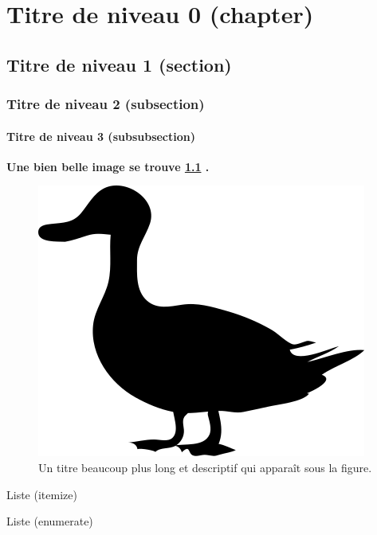 \chapter{Titre de niveau 0 (chapter)}
\thispagestyle{plainStarred}


\blindtext


\section{Titre de niveau 1 (section)}
\blindtext

	\subsection{Titre de niveau 2 (subsection)}
\blindtext

		\subsubsection{Titre de niveau 3 (subsubsection)}
\blindtext

\textbf{Une bien belle image se trouve \cref{fig56} .}

\begin{figure}
\begin{center}
	\includegraphics[scale=.8]{figures/conclu/figure_56.png}
	\caption[Titre court table des matières]{Un titre beaucoup plus long et descriptif qui apparaît sous la figure.}
	\label{fig56}
\end{center}
\end{figure}

\medskip
Liste (itemize)
\blinditemize

\medskip
Liste (enumerate)
\blindenumerate

